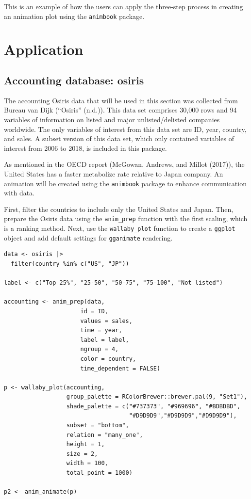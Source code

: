 This is an example of how the users can apply the three-step process in creating an animation plot using the \texttt{animbook} package.

\hypertarget{application}{%
\section{Application}\label{application}}

\hypertarget{accounting-database-osiris}{%
\subsection{Accounting database: osiris}\label{accounting-database-osiris}}

The accounting Osiris data that will be used in this section was collected from Bureau van Dijk ({``Osiris''} (n.d.)). This data set comprises 30,000 rows and 94 variables of information on listed and major unlisted/delisted companies worldwide. The only variables of interest from this data set are ID, year, country, and sales. A subset version of this data set, which only contained variables of interest from 2006 to 2018, is included in this package.

As mentioned in the OECD report (McGowan, Andrews, and Millot (2017)), the United States has a faster metabolize rate relative to Japan company. An animation will be created using the \texttt{animbook} package to enhance communication with data.

First, filter the countries to include only the United States and Japan. Then, prepare the Osiris data using the \texttt{anim\_prep} function with the first scaling, which is a ranking method. Next, use the \texttt{wallaby\_plot} function to create a \texttt{ggplot} object and add default settings for \texttt{gganimate} rendering.

\begin{verbatim}
data <- osiris |> 
  filter(country %in% c("US", "JP"))

label <- c("Top 25%", "25-50", "50-75", "75-100", "Not listed")

accounting <- anim_prep(data, 
                      id = ID, 
                      values = sales, 
                      time = year, 
                      label = label, 
                      ngroup = 4, 
                      color = country, 
                      time_dependent = FALSE)

p <- wallaby_plot(accounting,
                  group_palette = RColorBrewer::brewer.pal(9, "Set1"),
                  shade_palette = c("#737373", "#969696", "#BDBDBD",
                                    "#D9D9D9","#D9D9D9","#D9D9D9"),
                  subset = "bottom",
                  relation = "many_one",
                  height = 1,
                  size = 2,
                  width = 100,
                  total_point = 1000)

p2 <- anim_animate(p)
\end{verbatim}

